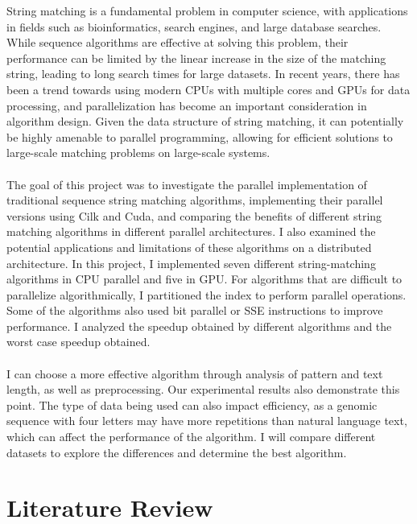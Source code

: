 \documentclass[11pt]{article}       %
\begin{document}
String matching is a fundamental problem in computer science, with applications in fields such as bioinformatics, search engines, and large database searches. While sequence algorithms are effective at solving this problem, their performance can be limited by the linear increase in the size of the matching string, leading to long search times for large datasets. In recent years, there has been a trend towards using modern CPUs with multiple cores and GPUs for data processing, and parallelization has become an important consideration in algorithm design. Given the data structure of string matching, it can potentially be highly amenable to parallel programming, allowing for efficient solutions to large-scale matching problems on large-scale systems.\\
\\The goal of this project was to investigate the parallel implementation of traditional sequence string matching algorithms, implementing their parallel versions using Cilk and Cuda, and comparing the benefits of different string matching algorithms in different parallel architectures. I also examined the potential applications and limitations of these algorithms on a distributed architecture. In this project, I implemented seven different string-matching algorithms in CPU parallel and five in GPU. For algorithms that are difficult to parallelize algorithmically, I partitioned the index to perform parallel operations. Some of the algorithms also used bit parallel or SSE instructions to improve performance. I analyzed the speedup obtained by different algorithms and the worst case speedup obtained.\\ 
\\I can choose a more effective algorithm through analysis of pattern and text length, as well as preprocessing. Our experimental results also demonstrate this point. The type of data being used can also impact efficiency, as a genomic sequence with four letters may have more repetitions than natural language text, which can affect the performance of the algorithm. I will compare different datasets to explore the differences and determine the best algorithm.\\

\section{Literature Review} \label{litrev}
\end{document}
